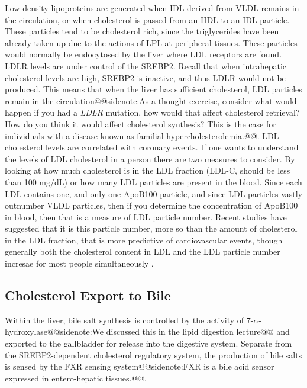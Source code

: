 \documentclass{tufte-handout}
\makeatletter
\def\sidenote#1{@@sidenote:#1@@}
\makeatother
\begin{document}
Low density lipoproteins are generated when IDL derived from VLDL remains in the circulation, or when cholesterol is passed from an HDL to an IDL particle.  These particles tend to be cholesterol rich, since the triglycerides have been already taken up due to the actions of LPL at peripheral tissues.  These particles would normally be endocytosed by the liver where LDL receptors are found.  LDLR levels are under control of the SREBP2.  Recall that when intrahepatic cholesterol levels are high, SREBP2 is inactive, and thus LDLR would not be produced.  This means that when the liver has sufficient cholesterol, LDL particles remain in the circulation\sidenote{As a thought exercise, consider what would happen if you had a \textit{LDLR} mutation, how would that affect cholesterol retrieval?  How do you think it would affect cholesterol synthesis?  This is the case for individuals with a disease known as familial hypercholesterolemia.}.  LDL cholesterol levels are correlated with coronary events.  If one wants to understand the levels of LDL cholesterol in a person there are two measures to consider.  By looking at how much cholesterol is in the LDL fraction (LDL-C, should be less than 100 mg/dL) or how many LDL particles are present in the blood.  Since each LDL contains one, and only one ApoB100 particle, and since LDL particles vastly outnumber VLDL particles, then if you determine the concentration of ApoB100 in blood, then that is a measure of LDL particle number.  Recent studies have suggested that it is this particle number, more so than the amount of cholesterol in the LDL fraction, that is more predictive of cardiovascular events, though generally both the cholesterol content in LDL and the LDL particle number incresae for most people simultaneously \citep{Cromwell2007,Mora2007}.

\subsection{Cholesterol Export to Bile}

Within the liver, bile salt synthesis is controlled by the activity of 7-$\alpha$-hydroxylase\sidenote{We discussed this in the lipid digestion lecture} and exported to the gallbladder for release into the digestive system.  Separate from the SREBP2-dependent cholesterol regulatory system, the production of bile salts is sensed by the FXR sensing system\sidenote{FXR is a bile acid sensor expressed in entero-hepatic tissues.}.
\end{document}
